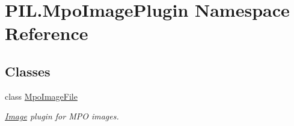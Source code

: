 \hypertarget{namespacePIL_1_1MpoImagePlugin}{}\section{P\+I\+L.\+Mpo\+Image\+Plugin Namespace Reference}
\label{namespacePIL_1_1MpoImagePlugin}
\subsection*{Classes}
\begin{DoxyCompactItemize}
\item 
class \hyperlink{classPIL_1_1MpoImagePlugin_1_1MpoImageFile}{Mpo\+Image\+File}
\begin{DoxyCompactList}\small\item\em \hyperlink{namespacePIL_1_1Image}{Image} plugin for M\+PO images. \end{DoxyCompactList}\end{DoxyCompactItemize}
